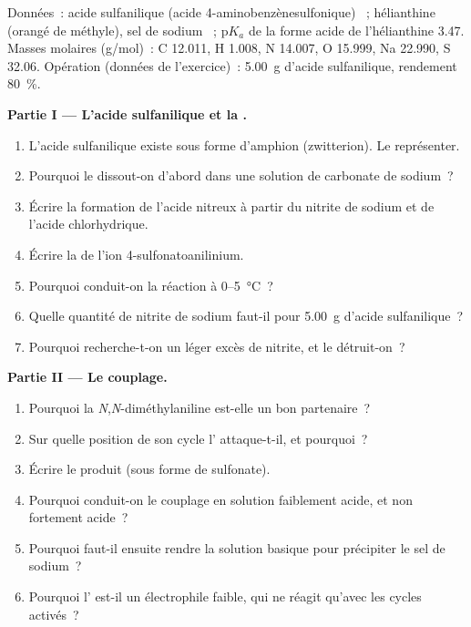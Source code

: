 \begin{problem}
\label{pb:b2:amines:1}
Données~: acide sulfanilique (acide 4-aminobenzènesulfonique) ~; hélianthine (orangé
de méthyle), sel de sodium ~; $\mathrm pK_a$ de la forme acide de l'hélianthine
3.47. Masses molaires (\unit{g/mol})~: C 12.011, H 1.008, N 14.007, O 15.999, Na 22.990, S 32.06.
Opération (données de l'exercice)~: \qty{5.00}{g} d'acide sulfanilique, rendement 80~\%.

\medskip
\noindent\textbf{Partie I --- L'acide sulfanilique et la .}
\begin{enumerate}
  \item L'acide sulfanilique existe sous forme d'amphion (zwitterion). Le représenter.
  \item Pourquoi le dissout-on d'abord dans une solution de carbonate de sodium~?
  \item Écrire la formation de l'acide nitreux à partir du nitrite de sodium et de l'acide chlorhydrique.
  \item Écrire la  de l'ion 4-sulfonatoanilinium.
  \item Pourquoi conduit-on la réaction à 0--\qty{5}{\degreeCelsius}~?
  \item Quelle quantité de nitrite de sodium faut-il pour \qty{5.00}{g} d'acide sulfanilique~?
  \item Pourquoi recherche-t-on un léger excès de nitrite, et le détruit-on~?
\end{enumerate}

\medskip
\noindent\textbf{Partie II --- Le couplage.}
\begin{enumerate}[resume]
  \item Pourquoi la \textit{N},\textit{N}-diméthylaniline est-elle un bon partenaire~?
  \item Sur quelle position de son cycle l' attaque-t-il, et pourquoi~?
  \item Écrire le produit (sous forme de sulfonate).
  \item Pourquoi conduit-on le couplage en solution faiblement acide, et non fortement acide~?
  \item Pourquoi faut-il ensuite rendre la solution basique pour précipiter le sel de sodium~?
  \item Pourquoi l' est-il un électrophile faible, qui ne réagit qu'avec les cycles activés~?
\end{enumerate}


\end{problem}
